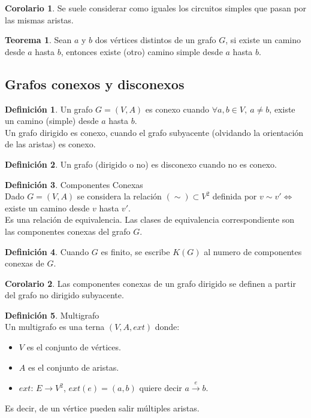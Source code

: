 \documentclass[10pt]{article}
\theoremstyle{definition}
\newtheorem{definition}{Definición}[section]
\newtheorem{theorem}{Teorema}[section]
\newtheorem{corollary}{Corolario}[theorem]
\begin{document}
    \begin{corollary}
        Se suele considerar como iguales los circuitos simples que pasan por las mismas aristas.
    \end{corollary}
    \begin{theorem}
        Sean $a$ y $b$ dos vértices distintos de un grafo $G$, si existe un camino desde $a$ hasta $b$, entonces existe (otro) camino simple desde $a$ hasta $b$.
    \end{theorem}
    \newpage\subsection{Grafos conexos y disconexos}
    \begin{definition}
        Un grafo $G=(V,A)$ es conexo cuando $\forall a,b\in V,\ a\neq b$, existe un camino (simple) desde $a$ hasta $b$.\\
        Un grafo dirigido es conexo, cuando el grafo subyacente (olvidando la orientación de las aristas) es conexo.
    \end{definition}
    \begin{definition}
        Un grafo (dirigido o no) es disconexo cuando no es conexo.
    \end{definition}
    \begin{definition}{Componentes Conexas}
        \\Dado $G=(V,A)$ se considera la relación $(\sim)\subset V^2$ definida por $v\sim v'\Leftrightarrow$ existe un camino desde $v$ hasta $v'$.\\Es una relación de equivalencia. Las clases de equivalencia correspondiente son las componentes conexas del grafo $G$.
    \end{definition}
    \begin{definition}
        Cuando $G$ es finito, se escribe $K(G)$ al numero de componentes conexas de $G$.
    \end{definition}
    \begin{corollary}
        Las componentes conexas de un grafo dirigido se definen a partir del grafo no dirigido subyacente.
    \end{corollary}
    \begin{definition}{Multigrafo}
        \\Un multigrafo es una terna $(V,A,ext)$ donde:
        \begin{itemize}
            \item $V$ es el conjunto de vértices.
            \item $A$ es el conjunto de aristas.
            \item $ext$: $E\to V^2$, $ext(e)=(a,b)$ quiere decir $a\xrightarrow{e} b$.
        \end{itemize}
        Es decir, de un vértice pueden salir múltiples aristas.
    \end{definition}
\end{document}
